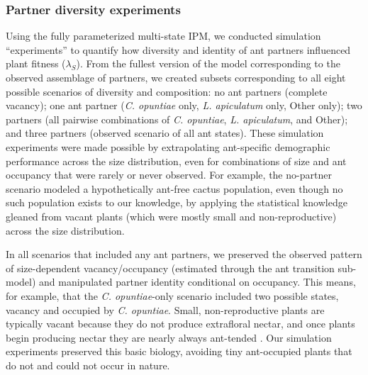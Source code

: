 \documentclass[11pt]{article}
\begin{document}
\subsubsection*{Partner diversity experiments}
Using the fully parameterized multi-state IPM, we conducted simulation ``experiments'' to quantify how diversity and identity of ant partners influenced plant fitness ($\lambda_{S}$). 
From the fullest version of the model corresponding to the observed assemblage of partners, we created subsets corresponding to all eight possible scenarios of diversity and composition: no ant partners (complete vacancy); one ant partner (\textit{C. opuntiae} only, \textit{L. apiculatum} only, Other only); two partners (all pairwise combinations of \textit{C. opuntiae}, \textit{L. apiculatum}, and Other); and three partners (observed scenario of all ant states).
These simulation experiments were made possible by extrapolating ant-specific demographic performance across the size distribution, even for combinations of size and ant occupancy that were rarely or never observed. 
For example, the no-partner scenario modeled a hypothetically ant-free cactus population, even though no such population exists to our knowledge, by applying the statistical knowledge gleaned from vacant plants (which were mostly small and non-reproductive) across the size distribution. 

In all scenarios that included any ant partners, we preserved the observed pattern of size-dependent vacancy/occupancy (estimated through the ant transition sub-model) and manipulated partner identity conditional on occupancy. 
This means, for example, that the \textit{C. opuntiae}-only scenario included two possible states, vacancy and occupied by \textit{C. opuntiae}. 
Small, non-reproductive plants are typically vacant because they do not produce extrafloral nectar, and once plants begin producing nectar they are nearly always ant-tended \citep{Miller2014}. 
Our simulation experiments preserved this basic biology, avoiding tiny ant-occupied plants that do not and could not occur in nature. 
\end{document}
